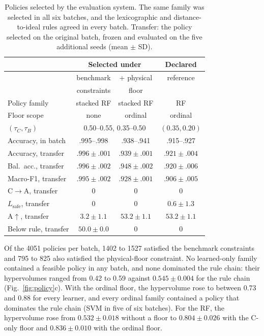 \documentclass[journal]{IEEEtran}
\newcommand{\Lsafe}{L_{\mathrm{safe}}}
\begin{document}
\begin{table}[t]
\caption{Policies selected by the evaluation system. The same family was selected in all six batches, and the lexicographic and distance-to-ideal rules agreed in every batch. Transfer: the policy selected on the original batch, frozen and evaluated on the five additional seeds (mean $\pm$ SD).}
\label{tab:selection}
\centering
\footnotesize
\setlength{\tabcolsep}{2.5pt}
\begin{tabular}{@{}>{\raggedright\arraybackslash}p{}ccc@{}}
\toprule
 & \multicolumn{2}{c}{Selected under} & Declared \\
\cmidrule(lr){2-3}
 & benchmark & + physical & reference \\
 & constraints & floor & \\
\midrule
Policy family & stacked RF & stacked RF & RF \\
Floor scope & none & ordinal & ordinal \\
$(\tau_C,\tau_B)$ & \multicolumn{2}{c}{0.50--0.55, 0.35--0.50} & $(0.35,0.20)$ \\
Accuracy, in batch & .995--.998 & .938--.941 & .915--.927 \\
\midrule
Accuracy, transfer & $.996\pm.001$ & $.939\pm.001$ & $.921\pm.004$ \\
Bal.\ acc., transfer & $.996\pm.002$ & $.948\pm.002$ & $.920\pm.006$ \\
Macro-F1, transfer & $.995\pm.002$ & $.928\pm.001$ & $.906\pm.005$ \\
C$\rightarrow$A, transfer & 0 & 0 & 0 \\
$\Lsafe$, transfer & 0 & 0 & $0.6\pm1.3$ \\
A$\uparrow$, transfer & $3.2\pm1.1$ & $53.2\pm1.1$ & $53.2\pm1.1$ \\
Below rule, transfer & $50.0\pm0.0$ & 0 & 0 \\
\bottomrule
\end{tabular}
\end{table}

Of the 4051 policies per batch, 1402 to 1527 satisfied the benchmark constraints and 795 to 825 also satisfied the physical-floor constraint. No learned-only family contained a feasible policy in any batch, and none dominated the rule chain: their hypervolumes ranged from 0.42 to 0.59 against $0.545\pm0.004$ for the rule chain (Fig.~\ref{fig:policy}c). With the ordinal floor, the hypervolume rose to between 0.73 and 0.88 for every learner, and every ordinal family contained a policy that dominates the rule chain (SVM in five of six batches). For the RF, the hypervolume rose from $0.532\pm0.018$ without a floor to $0.804\pm0.026$ with the C-only floor and $0.836\pm0.010$ with the ordinal floor.
\end{document}
